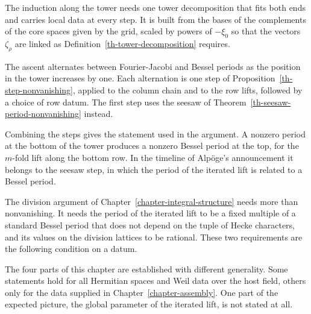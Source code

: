 The induction along the tower needs one tower decomposition that fits both
ends and carries local data at every step. It is built from the bases of the
complements of the core spaces given by the grid, scaled by powers of
$-\xi_0$ so that the vectors $\zeta_\rho$ are linked as
Definition~\ref{th-tower-decomposition} requires.

The ascent alternates between Fourier-Jacobi and Bessel periods as the position
in the tower increases by one. Each alternation is one step of
Proposition~\ref{th-step-nonvanishing}, applied to the column chain and to the
row lifts, followed by a choice of row datum. The first step uses the seesaw of
Theorem~\ref{th-seesaw-period-nonvanishing} instead.

Combining the steps gives the statement used in the argument. A nonzero period
at the bottom of the tower produces a nonzero Bessel period at the top, for the
$m$-fold lift along the bottom row. In the timeline of Alpöge's announcement
it belongs to the seesaw step, in which the period of the iterated lift is
related to a Bessel period.

The division argument of Chapter~\ref{chapter-integral-structure} needs more
than nonvanishing. It needs the period of the iterated lift to be a fixed
multiple of a standard Bessel period that does not depend on the tuple of Hecke
characters, and its values on the division lattices to be rational. These two
requirements are the following condition on a datum.

The four parts of this chapter are established with different generality.
Some statements hold for all Hermitian spaces and Weil data over the host
field, others only for the data supplied in Chapter~\ref{chapter-assembly}.
One part of the expected picture, the global parameter of the iterated lift,
is not stated at all.
